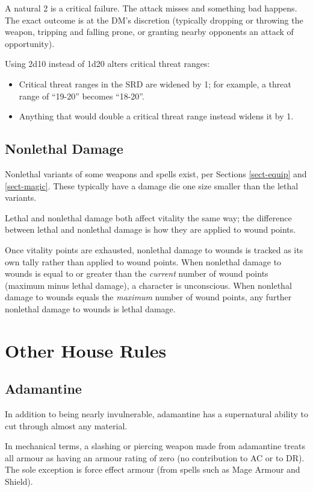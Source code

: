 A natural 2 is a critical failure. The attack misses and something bad
happens. The exact outcome is at the DM's discretion (typically dropping
or throwing the weapon, tripping and falling prone, or granting nearby
opponents an attack of opportunity).

Using 2d10 instead of 1d20 alters critical threat ranges:
\begin{itemize}
\item Critical threat ranges in the SRD are widened by 1; for example, a
threat range of ``19-20'' becomes ``18-20''.
\item Anything that would double a critical threat range instead widens it
by 1.
\end{itemize}

%
\subsection{Nonlethal Damage}

Nonlethal variants of some weapons and spells exist, per Sections
\ref{sect-equip} and \ref{sect-magic}. These typically have a damage die one
size smaller than the lethal variants.

Lethal and nonlethal damage both affect vitality the same way; the difference
between lethal and nonlethal damage is how they are applied to wound points.

Once vitality points are exhausted, nonlethal damage to wounds is tracked as
its own tally rather than applied to wound points. When nonlethal damage to
wounds is equal to or greater than the \textit{current} number of wound
points (maximum minus lethal damage), a character is unconscious. When
nonlethal damage to wounds equals the \textit{maximum} number of wound
points, any further nonlethal damage to wounds is lethal damage.

%
%
\section{Other House Rules}

%
\subsection{Adamantine}

In addition to being nearly invulnerable, adamantine has a supernatural
ability to cut through almost any material.

In mechanical terms, a slashing or piercing weapon made from adamantine
treats all armour as having an armour rating of zero (no contribution to AC
or to DR). The sole exception is force effect armour (from spells such as
Mage Armour and Shield).

